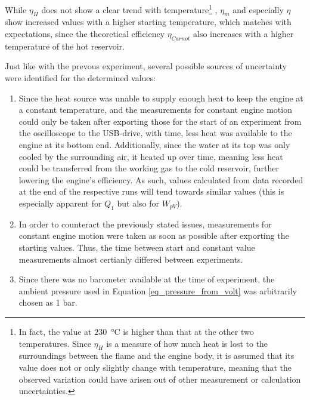 \documentclass[titlepage]{article}
\begin{document}
While \(\eta_H\) does not show a clear trend with temperature\footnote{In fact, the value at 230~°C is higher than that at the other two temperatures. Since \(\eta_H\) is a measure of how much heat is lost to the surroundings between the flame and the engine body, it is assumed that its value does not or only slightly change with temperature, meaning that the observed variation could have arisen out of other measurement or calculation uncertainties.}
, \(\eta_m\) and especially \(\eta\) show increased values with a higher starting temperature, which matches with expectations, since the theoretical efficiency \(\eta_{Carnot}\) also increases with a higher temperature of the hot reservoir.

Just like with the prevous experiment, several possible sources of uncertainty were identified for the determined values:
\begin{enumerate}
    \item Since the heat source was unable to supply enough heat to keep the engine at a constant temperature, and the measurements for constant engine motion could only be taken after exporting those for the start of an experiment from the oscilloscope to the USB-drive, with time, less heat was available to the engine at its bottom end. Additionally, since the water at its top was only cooled by the surrounding air, it heated up over time, meaning less heat could be transferred from the working gas to the cold reservoir, further lowering the engine's efficiency. As such, values calculated from data recorded at the end of the respective runs will tend towards similar values (this is especially apparent for \(Q_1\) but also for \(W_{pV}\)).
    \item In order to counteract the previously stated issues, measurements for constant engine motion were taken as soon as possible after exporting the starting values. Thus, the time between start and constant value measurements almost certianly differed between experiments.
    \item Since there was no barometer available at the time of experiment, the ambient pressure used in Equation \ref{eq_pressure_from_volt} was arbitrarily chosen as 1 bar.
\end{enumerate}
\end{document}
